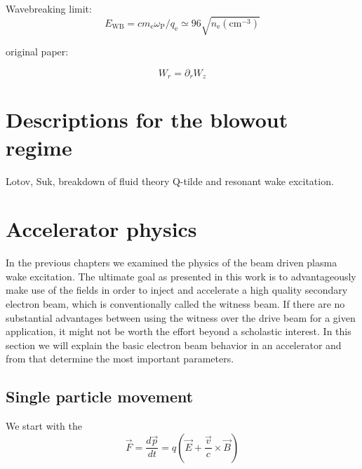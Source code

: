 Wavebreaking limit: \begin{equation}
E_\mathrm{WB}=cm_\mathrm{e}\omega_\mathrm{P}/q_\mathrm{e}\simeq 96 \sqrt{n_\mathrm{e}(\mathrm{cm}^{-3})}
\end{equation}


original paper:  \cite{Panowsky_Wenzel_original}

 \begin{equation}
W_r =\partial_r W_z
\end{equation} 
\section{Descriptions for the blowout regime}
Lotov, Suk, breakdown of fluid theory
Q-tilde and resonant wake excitation.


\section{Accelerator physics}
In the previous chapters we examined the physics of the beam driven plasma wake excitation. 
The ultimate goal as presented in this work is to advantageously make use of the fields in order to inject and accelerate a high quality secondary electron beam, which is conventionally called the witness beam. If there are no substantial advantages between  using the witness over the drive beam for a given application, it might not be worth the effort beyond a scholastic interest.
In this section we will explain the basic electron beam behavior in an accelerator and from that determine the most important parameters. 
\subsection{Single particle movement}

We start with the 
\begin{equation}
\vec{F}=\frac{d\vec{p}}{dt}=q(\vec{E}+\frac{\vec{v}}{c}\times\vec{B})
\end{equation}

